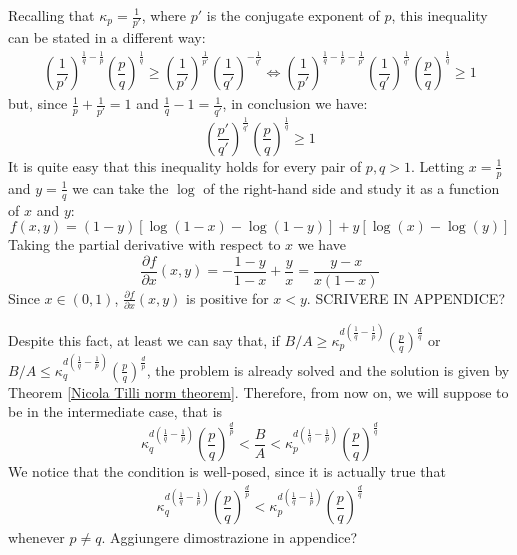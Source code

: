 \documentclass[corpo=11pt, stile=classica, tipotesi=custom,
greek, evenboxes, english]{toptesi}
\numberwithin{equation}{chapter}
\theoremstyle{remark}
\newcommand{\pdfrac}[2]{\dfrac{\partial #1}{\partial #2}}
\newcommand{\pfrac}[2]{\frac{\partial #1}{\partial #2}}
\begin{document}
Recalling that $\kappa_p =\frac{1}{p'}$, where $p'$ is the conjugate exponent of $p$, this inequality can be stated in a different way:
\begin{align*}
	\left(\dfrac{1}{p'}\right)^{\frac{1}{q}-\frac{1}{p}}\left(\dfrac{p}{q}\right)^{\frac{1}{q}} \geq \left(\dfrac{1}{p'}\right)^{\frac{1}{p'}} \left(\dfrac{1}{q'}\right)^{-\frac{1}{q'}}\iff \left(\dfrac{1}{p'}\right)^{\frac{1}{q}-\frac{1}{p} - \frac{1}{p'}}\left(\dfrac{1}{q'}\right)^{\frac{1}{q'}} \left(\dfrac{p}{q}\right)^{\frac{1}{q}} \geq 1
\end{align*}
but, since $\frac{1}{p}+\frac{1}{p'}=1$ and $\frac{1}{q} - 1 = \frac{1}{q'}$, in conclusion we have:
\begin{equation*}
	\left(\dfrac{p'}{q'}\right)^{\frac1{q'}} \left(\dfrac{p}{q}\right)^{\frac{1}{q}} \geq 1
\end{equation*}
{\color{blue}It is quite easy that this inequality holds for every pair of $p,q>1$. Letting $x=\frac{1}{p}$ and $y=\frac{1}{q}$ we can take the $\log$ of the right-hand side and study it as a function of $x$ and $y$:
	\begin{equation*}
		f(x,y) = (1-y)\left[\log(1-x) - \log(1-y)\right] + y\left[\log(x) - \log(y)\right]
	\end{equation*}
	Taking the partial derivative with respect to $x$ we have
	\begin{equation*}
		\pdfrac{f}{x}(x,y) = -\dfrac{1-y}{1-x} + \dfrac{y}{x} = \dfrac{y-x}{x(1-x)}
	\end{equation*}
	Since $x \in (0,1)$, $\pfrac{f}{x}(x,y)$ is positive for $x<y$. SCRIVERE IN APPENDICE?}

Despite this fact, at least we can say that, if $B/A \geq \kappa_p^{d\left(\frac{1}{q}-\frac{1}{p}\right)}\left(\frac{p}{q}\right)^{\frac{d}{q}}$ or $B/A \leq \kappa_q^{d\left(\frac{1}{q}-\frac{1}{p}\right)}\left(\frac{p}{q}\right)^{\frac{d}{p}}$, the problem is already solved and the solution is given by Theorem \ref{Nicola Tilli norm theorem}. Therefore, from now on, we will suppose to be in the intermediate case, that is
\begin{equation}\label{intermediate regime}
	\kappa_q^{d\left(\frac{1}{q}-\frac{1}{p}\right)} \left(\dfrac{p}{q}\right)^{\frac{d}{p}} < \dfrac{B}{A} < \kappa_p^{d\left(\frac{1}{q}-\frac{1}{p}\right)} \left(\dfrac{p}{q}\right)^{\frac{d}{q}}
\end{equation}
We notice that the condition is well-posed, since it is actually true that
\begin{align*}
	\kappa_q^{d\left(\frac{1}{q}-\frac{1}{p}\right)} \left(\dfrac{p}{q}\right)^{\frac{d}{p}} < \kappa_p^{d\left(\frac{1}{q}-\frac{1}{p}\right)} \left(\dfrac{p}{q}\right)^{\frac{d}{q}}
\end{align*}
whenever $p \neq q$. {\color{blue} Aggiungere dimostrazione in appendice?}
\end{document}
